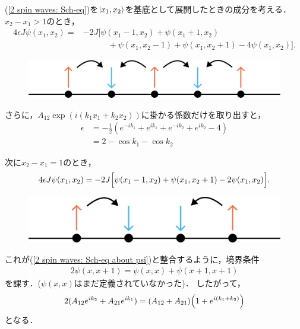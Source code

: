 \documentclass[dvipdfmx,9pt]{beamer}
\numberwithin{equation}{section}
\begin{document}
\begin{frame}{}
    (\ref{2 spin waves: Sch-eq})を$\ket{x_1, x_2}$を基底として展開したときの成分を考える．$x_2 - x_1 > 1$のとき，
    \begin{align}
        4\epsilon J\psi(x_1, x_2) = &
        -2J\Big[
            \psi(x_1-1, x_2) + \psi(x_1+1, x_2) \nonumber
        \\ & \qquad\quad
        + \psi(x_1, x_2-1) + \psi(x_1, x_2+1) - 4\psi(x_1, x_2)\Big].
        \label{2 spin waves: Sch-eq about psi}
    \end{align}
    \begin{figure}[H]
        \centering
        \includegraphics[scale = 0.3]{i1.pdf}
    \end{figure}
    さらに，$A_{12}\exp(i(k_1 x_1 + k_2 x_2))$に掛かる係数だけを取り出すと，
    \begin{align}
        \epsilon
        &\nonumber
        = -\frac{1}{2}(e^{-ik_1} + e^{ik_1} + e^{-ik_2} + e^{ik_2} - 4)
        \\ &
        = 2-\cos{k_1}-\cos{k_2}
    \end{align}

\end{frame}

\begin{frame}{}
    次に$x_2 - x_1 = 1$のとき，
    \begin{align}
        4\epsilon J\psi(x_1, x_2) = -2J \qty\Big[\psi(x_1-1,x_2) + \psi(x_1,x_2+1) - 2\psi(x_1,x_2)].
    \end{align}
    \begin{figure}[H]
        \centering
        \includegraphics[scale = 0.3]{i2.pdf}
    \end{figure}
    これが(\ref{2 spin waves: Sch-eq about psi})と整合するように，境界条件
    \begin{align}
        2\psi(x, x+1) = \psi(x, x) + \psi(x+1,x+1)
    \end{align}
    を課す．($\psi(x,x)$はまだ定義されていなかった)．
    したがって，
    \begin{gather}
        2(A_{12}e^{ik_2} + A_{21}e^{ik_1})
        = (A_{12}+A_{21})\qty(1+e^{i(k_1+k_2)})
        \label{2 spin waves: connection condition}
    \end{gather}
    となる．
\end{frame}
\end{document}
